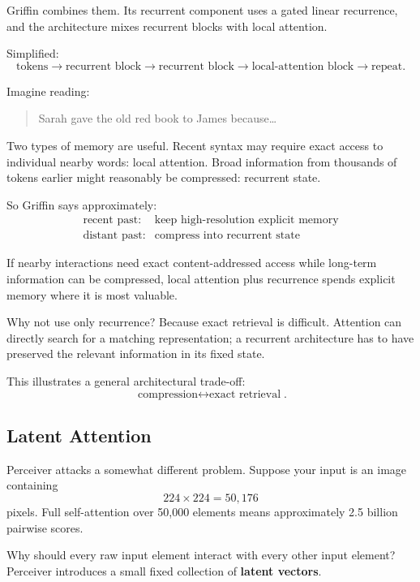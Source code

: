 Griffin combines them.
Its recurrent component uses a gated linear recurrence, and the architecture mixes recurrent blocks with local attention.

Simplified:
\[
\boxed{
\text{tokens}
\rightarrow
\text{recurrent block}
\rightarrow
\text{recurrent block}
\rightarrow
\text{local-attention block}
\rightarrow
\text{repeat}
}.
\]

Imagine reading:
\begin{quote}
Sarah gave the old red book to James because\ldots
\end{quote}

Two types of memory are useful.
Recent syntax may require exact access to individual nearby words: local attention.
Broad information from thousands of tokens earlier might reasonably be compressed: recurrent state.

So Griffin says approximately:
\[
\boxed{
\begin{array}{ll}
\text{recent past}:&\text{keep high-resolution explicit memory}\\
\text{distant past}:&\text{compress into recurrent state}
\end{array}}
\]

\begin{calloutbias}
If nearby interactions need exact content-addressed access while long-term information can be compressed, local attention plus recurrence spends explicit memory where it is most valuable.
\end{calloutbias}

Why not use only recurrence?
Because exact retrieval is difficult.
Attention can directly search for a matching representation; a recurrent architecture has to have preserved the relevant information in its fixed state.

This illustrates a general architectural trade-off:
\[
\boxed{\text{compression}\longleftrightarrow\text{exact retrieval}}.
\]

\subsection{Latent Attention}
\label{subsec:modern-perceiver}
Perceiver attacks a somewhat different problem.
Suppose your input is an image containing
\[
224\times224=50{,}176
\]
pixels.
Full self-attention over 50,000 elements means approximately 2.5 billion pairwise scores.

Why should every raw input element interact with every other input element?
Perceiver introduces a small fixed collection of \textbf{latent vectors}.

